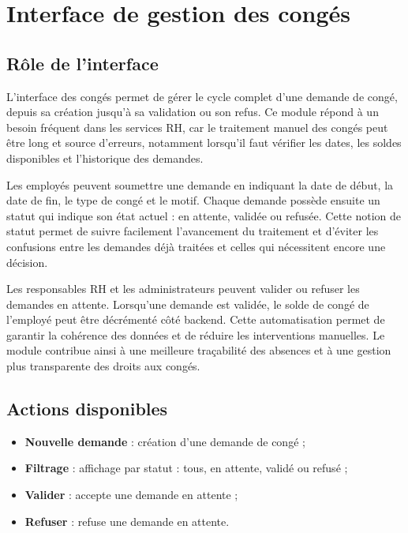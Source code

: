 \documentclass[12pt,a4paper]{report}
\begin{document}
\section{Interface de gestion des congés}

\subsection{Rôle de l'interface}

L'interface des congés permet de gérer le cycle complet d'une demande de congé, depuis sa création jusqu'à sa validation ou son refus. Ce module répond à un besoin fréquent dans les services RH, car le traitement manuel des congés peut être long et source d'erreurs, notamment lorsqu'il faut vérifier les dates, les soldes disponibles et l'historique des demandes.

Les employés peuvent soumettre une demande en indiquant la date de début, la date de fin, le type de congé et le motif. Chaque demande possède ensuite un statut qui indique son état actuel : en attente, validée ou refusée. Cette notion de statut permet de suivre facilement l'avancement du traitement et d'éviter les confusions entre les demandes déjà traitées et celles qui nécessitent encore une décision.

Les responsables RH et les administrateurs peuvent valider ou refuser les demandes en attente. Lorsqu'une demande est validée, le solde de congé de l'employé peut être décrémenté côté backend. Cette automatisation permet de garantir la cohérence des données et de réduire les interventions manuelles. Le module contribue ainsi à une meilleure traçabilité des absences et à une gestion plus transparente des droits aux congés.

\subsection{Actions disponibles}

\begin{itemize}
    \item \textbf{Nouvelle demande} : création d'une demande de congé ;
    \item \textbf{Filtrage} : affichage par statut : tous, en attente, validé ou refusé ;
    \item \textbf{Valider} : accepte une demande en attente ;
    \item \textbf{Refuser} : refuse une demande en attente.
\end{itemize}
\end{document}
